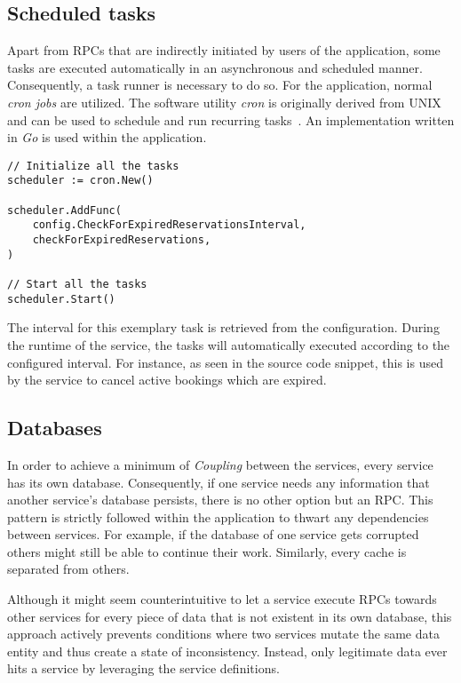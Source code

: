 \documentclass[12pt,a4paper,twoside]{report}
\begin{document}
\subsection{Scheduled tasks}

Apart from RPCs that are indirectly initiated by users of the application,
some tasks are executed automatically in an asynchronous and scheduled manner.
Consequently, a task runner is necessary to do so.
For the application, normal \textit{cron jobs} are utilized.
The software utility \textit{cron} is originally derived from UNIX and can be
used to schedule and run recurring tasks~\cite{crontab}.
An implementation written in \textit{Go} is used within the application.

\begin{lstlisting}[title=services/fleet-monitor/bookings.go]
// Initialize all the tasks
scheduler := cron.New()

scheduler.AddFunc(
    config.CheckForExpiredReservationsInterval,
    checkForExpiredReservations,
)

// Start all the tasks
scheduler.Start()
\end{lstlisting}

The interval for this exemplary task is retrieved from the configuration.
During the runtime of the service, the tasks will automatically executed according
to the configured interval.
For instance, as seen in the source code snippet, this is used by the
 service to cancel active bookings which are expired.

\subsection{Databases} \label{subsect:databases}

In order to achieve a minimum of \textit{Coupling} between the services,
every service has its own database.
Consequently, if one service needs any information that another service's
database persists, there is no other option but an RPC.
This pattern is strictly followed within the application to thwart any
dependencies between services. For example, if the database of one service gets
corrupted others might still be able to continue their work.
Similarly, every cache is separated from others.

Although it might seem counterintuitive to let a service execute RPCs towards
other services for every piece of data that is not existent in its own database,
this approach actively prevents conditions where two services mutate the same
data entity and thus create a state of inconsistency.
Instead, only legitimate data ever hits a service by leveraging the service definitions.
\end{document}
